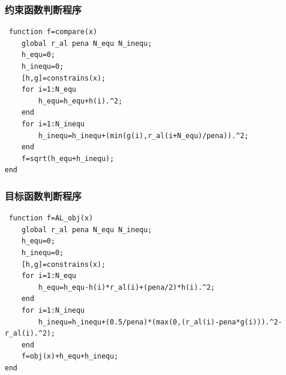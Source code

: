 \documentclass[12pt]{article}%
\begin{document}
 \subsubsection{约束函数判断程序}
 \begin{lstlisting}
 function f=compare(x)
	global r_al pena N_equ N_inequ;
	h_equ=0;
	h_inequ=0;
	[h,g]=constrains(x);
	for i=1:N_equ
		h_equ=h_equ+h(i).^2;
	end
	for i=1:N_inequ
		h_inequ=h_inequ+(min(g(i),r_al(i+N_equ)/pena)).^2;
	end
	f=sqrt(h_equ+h_inequ);
end
 \end{lstlisting}
  \subsubsection{目标函数判断程序}
 \begin{lstlisting}
 function f=AL_obj(x)
	global r_al pena N_equ N_inequ;
	h_equ=0;
	h_inequ=0;
	[h,g]=constrains(x);
	for i=1:N_equ
		h_equ=h_equ-h(i)*r_al(i)+(pena/2)*h(i).^2;
	end
	for i=1:N_inequ
		h_inequ=h_inequ+(0.5/pena)*(max(0,(r_al(i)-pena*g(i))).^2-r_al(i).^2);
	end
	f=obj(x)+h_equ+h_inequ;
end
 \end{lstlisting}
\end{document}
